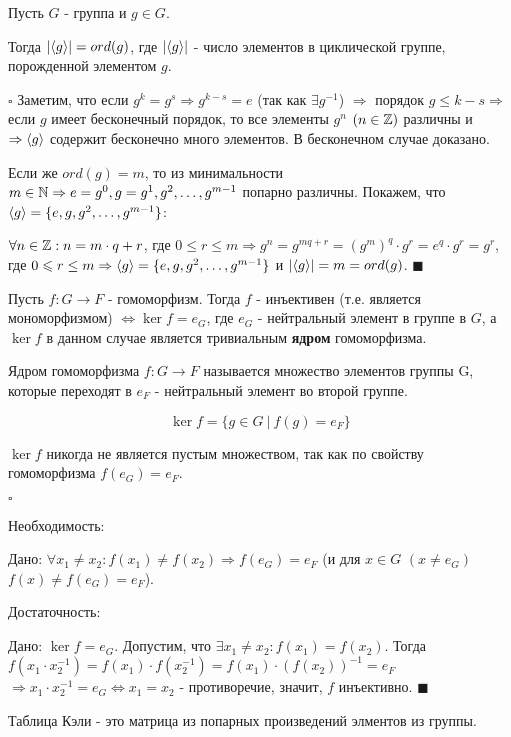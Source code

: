\documentclass[../main.tex]{subfiles}
\begin{document}
 Пусть $G$ - группа и $g\in G$.

Тогда $\vert \langle g\rangle\vert = ord(g)$, где $\vert \langle g\rangle\vert$ - число элементов в циклической группе, порожденной элементом $g$.

\void
$\square$ Заметим, что если $g^k = g^s \Rightarrow g^{k-s} = e$ (так как $\exists g^{-1}$) $\Rightarrow$
порядок $g \leqslant k - s \Rightarrow$ если $g$ имеет бесконечный порядок, то все элементы $g^n$ $(n\in\mathbb{Z})$
различны и $\Rightarrow \langle g\rangle$ содержит бесконечно много элементов. В бесконечном случае доказано.

\void
Если же $ord(g) = m$, то из минимальности $m\in\mathbb{N} \Rightarrow e=g^0, g=g^1, g^2,\dots,g^{m-1}$ попарно
различны. Покажем, что $\langle g\rangle = \{e, g, g^2,\dots,g^{m-1}\}$:

$\forall n\in\mathbb{Z}: n = m\cdot q + r$, где $0\leqslant r \le m \Rightarrow g^n = g^{mq+r} = (g^m)^q\cdot g^r =
e^q\cdot g^r = g^r$, где $0\leqslant r\le m \Rightarrow \langle g\rangle = \{e,g,g^2,\dots,g^{m-1}\}$
и $\vert \langle g\rangle\vert = m = ord(g)$. $\blacksquare$

\void
{} Пусть $f: G\rightarrow F$ - гомоморфизм. Тогда $f$ - инъективен (т.е. является мономорфизмом)
$\Leftrightarrow \ker{f} = e_G$, где $e_G$ - нейтральный элемент в группе в $G$, а $\ker{f}$ в данном
случае является тривиальным \textbf{ядром} гомоморфизма.

\void
{} Ядром гомоморфизма $f: G\rightarrow F$ называется множество элементов группы G, которые переходят
в $e_F$ - нейтральный элемент во второй группе.

$$\ker{f} = \{g\in G\:\vert\: f(g) = e_F\}$$

\void
{} $\ker{f}$ никогда не является пустым множеством, так как по свойству гомоморфизма $f(e_G) = e_F$.

\void
$\square$

\fbox{$\Rightarrow$} Необходимость:

Дано: $\forall x_1 \neq x_2: f(x_1)\neq f(x_2)\Rightarrow f(e_G) = e_F$ 
(и для $x\in G$ $(x\neq e_G)$ $f(x)\neq f(e_G) = e_F$).

\fbox{$\Leftarrow$} Достаточность:

Дано: $\ker{f} = e_G$. Допустим, что $\exists x_1\neq x_2: f(x_1) = f(x_2)$.
Тогда $f(x_1\cdot x_2^{-1}) = f(x_1)\cdot f(x_2^{-1}) = f(x_1)\cdot(f(x_2))^{-1} = e_F$
$\Rightarrow x_1\cdot x_2^{-1} = e_G \Leftrightarrow x_1 = x_2$ - противоречие, значит,
$f$ инъективно. $\blacksquare$

\void
{} Таблица Кэли - это матрица из попарных произведений элментов из группы.
\end{document}
